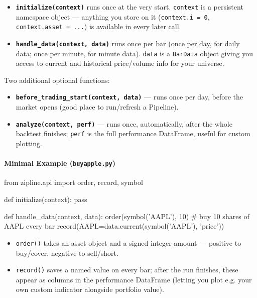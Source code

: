 \documentclass[12pt,openany]{book}
\theoremstyle{definition}
\theoremstyle{remark}
\begin{document}
\begin{itemize}
\item 
\textbf{\texttt{initialize(context)}} runs once at the very start. \texttt{context} is a persistent namespace object — anything you store on it (\texttt{context.i = 0}, \texttt{context.asset = ...}) is available in every later call.

\item 
\textbf{\texttt{handle\_data(context, data)}} runs once per bar (once per day, for daily data; once per minute, for minute data). \texttt{data} is a \texttt{BarData} object giving you access to current and historical price/volume info for your universe.

\end{itemize}

Two additional optional functions:

\begin{itemize}
\item 
\textbf{\texttt{before\_trading\_start(context, data)}} — runs once per day, before the market opens (good place to run/refresh a Pipeline).

\item 
\textbf{\texttt{analyze(context, perf)}} — runs once, automatically, after the whole backtest finishes; \texttt{perf} is the full performance DataFrame, useful for custom plotting.

\end{itemize}

\paragraph{Minimal Example (\texttt{buyapple.py})}

\begin{python}
from zipline.api import order, record, symbol

def initialize(context):
    pass

def handle_data(context, data):
    order(symbol('AAPL'), 10)  # buy 10 shares of AAPL every bar
    record(AAPL=data.current(symbol('AAPL'), 'price'))
\end{python}

\begin{itemize}
\item 
\texttt{order()} takes an asset object and a signed integer amount — positive to buy/cover, negative to sell/short.

\item 
\texttt{record()} saves a named value on every bar; after the run finishes, these appear as columns in the performance DataFrame (letting you plot e.g. your own custom indicator alongside portfolio value).

\end{itemize}
\end{document}
